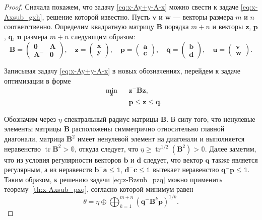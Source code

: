 \documentclass[specialist,
               substylefile = spbu.rtx,
               subf,href,colorlinks=true, 12pt]{disser}
\DeclareMathOperator{\tr}{tr}
\theoremstyle{definition}
\begin{document}
\begin{proof}
Сначала покажем, что задачу \eqref{eq:x-Ay+y-A-x} можно свести к задаче \eqref{eq:x-Axsub_gxh}, решение которой известно.
Пусть $\bm{v}$ и $\bm{w}$ --- векторы размера $m$ и $n$ соответственно.
Определим квадратную матрицу $\bm{B}$ порядка $m+n$ и векторы $\bm{z}$, $\bm{p}$, $\bm{q}$, $\bm{u}$ размера $m+n$ следующим образом:
\begin{equation*}
\bm{B}=
\begin{pmatrix}
\bm{0} &\bm{A}\\
\bm{A}^{-} &\bm{0}
\end{pmatrix},
\quad
\bm{z}=
\begin{pmatrix}
\bm{x}\\
\bm{y}
\end{pmatrix},
\quad
\bm{p}=
\begin{pmatrix}
\bm{a}\\
\bm{c}
\end{pmatrix},
\quad
\bm{q}=
\begin{pmatrix}
\bm{b}\\
\bm{d}
\end{pmatrix},
\quad
\bm{u}
=
\begin{pmatrix}
\bm{v}\\
\bm{w}
\end{pmatrix}.
\end{equation*}

Записывая задачу \eqref{eq:x-Ay+y-A-x} в новых обозначениях, перейдем к задаче оптимизации в форме
\begin{equation}\label{eq:z-Bzsub_pzq}
\begin{aligned}
&
\min_{\bm{z}}
&&\bm{z}^{-}\bm{B}\bm{z},\\
& &&\bm{p}\leq\bm{z}\leq\bm{q}.
\end{aligned}
\end{equation}

Обозначим через $\eta$ спектральный радиус матрицы $\bm{B}$. В силу того, что ненулевые элементы матрицы $\bm{B}$ расположены симметрично относительно главной диагонали, матрица $\bm{B}^{2}$ имеет ненулевой элемент на диагонали и выполняется неравенство $\tr\bm{B}^{2}>\mathbb{0}$, откуда следует, что $\eta\geq\tr^{1/2}(\bm{B}^{2})>\mathbb{0}$.
Далее заметим, что из условия регулярности векторов $\bm{b}$ и $\bm{d}$ следует, что вектор $\bm{q}$  также является регулярным,
а из неравенств $\bm{b}^{-}\bm{a}\leq\mathbb{1}$, $\bm{d}^{-}\bm{c}\leq\mathbb{1}$ вытекает неравенство $\bm{q}^{-}\bm{p}\leq\mathbb{1}$.
Таким образом, к решению задачи \eqref{eq:z-Bzsub_pzq} можно применить теорему~\ref{th:x-Axsub_pxq}, согласно которой минимум равен
\begin{equation}
\label{eq:theta_B}
\theta
=
\eta
\oplus
\bigoplus_{k=1}^{m+n}(\bm{q}^{-}\bm{B}^{k}\bm{p})^{1/k}.
\end{equation}


\end{proof}
\end{document}
